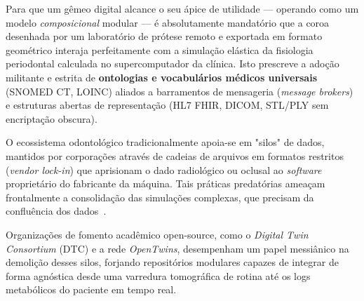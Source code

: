 Para que um gêmeo digital alcance o seu ápice de utilidade — operando como um modelo \textit{composicional} modular — é absolutamente mandatório que a coroa desenhada por um laboratório de prótese remoto e exportada em formato geométrico interaja perfeitamente com a simulação elástica da fisiologia periodontal calculada no supercomputador da clínica. Isto prescreve a adoção militante e estrita de \textbf{ontologias e vocabulários médicos universais} (SNOMED CT, LOINC) aliados a barramentos de mensageria (\textit{message brokers}) e estruturas abertas de representação (HL7 FHIR, DICOM, STL/PLY sem encriptação obscura).

O ecossistema odontológico tradicionalmente apoia-se em "silos" de dados, mantidos por corporações através de cadeias de arquivos em formatos restritos (\textit{vendor lock-in}) que aprisionam o dado radiológico ou oclusal ao \textit{software} proprietário do fabricante da máquina. Tais práticas predatórias ameaçam frontalmente a consolidação das simulações complexas, que precisam da confluência dos dados~\cite{robles2023opentwins}.


Organizações de fomento acadêmico open-source, como o \textit{Digital Twin Consortium} (DTC) e a rede \textit{OpenTwins}, desempenham um papel messiânico na demolição desses silos, forjando repositórios modulares capazes de integrar de forma agnóstica desde uma varredura tomográfica de rotina até os logs metabólicos do paciente em tempo real.
